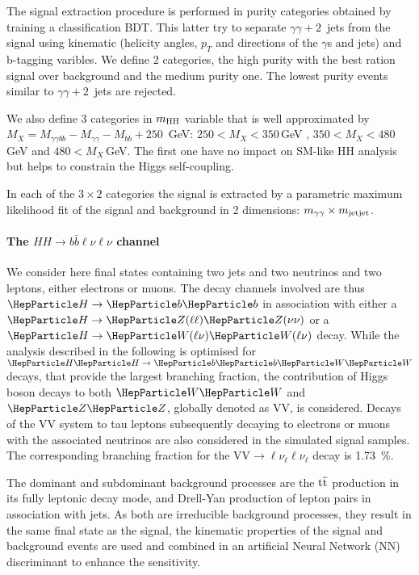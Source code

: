The signal extraction procedure is performed in purity categories obtained by training a classification BDT. This latter try to separate $\gamma\gamma + 2$~jets from the signal using kinematic (helicity angles, $p_T$ and directions of the $\gamma$s and jets) and b-tagging varibles. We define 2 categories, the high purity with the best ration signal over background and the medium purity one. The lowest purity events similar to $\gamma\gamma + 2$~jets are rejected.

We also define 3 categories in $m_{\rm HH}$ variable that is well approximated by $M_{X} = M_{\gamma\gamma bb} - M_{\gamma\gamma} - M_{bb} + 250$~GeV: $250 < M_{X} < 350$\,GeV , $350 < M_{X} < 480$\,GeV and  $480 < M_{X}$\,GeV. The first one have no impact on SM-like HH analysis but helps to constrain the Higgs self-coupling.

In each of the $3 \times 2$ categories the signal is extracted by a parametric maximum likelihood fit of the signal and background in 2 dimensions: $m_{\gamma\gamma} \times m_{\rm jet jet}$.

\paragraph{The $HH \rightarrow b\bar{b}\ell\nu\ell\nu$ channel}

We consider here \HH final states containing two \PQb jets  and two neutrinos and two leptons, either electrons or muons.
The decay channels involved are thus $\PH\to\bb$ in association with either a $\PH\to\PZ(\ell\ell)\PZ(\nu\nu)$ or a $\PH \to \PW(\ell\nu)\PW(\ell\nu)$ decay.
While the analysis described in the following is optimised for $\HH\to\bbWW$ decays, that provide the largest branching fraction, the contribution of Higgs boson decays to both $\PW\PW$ and $\PZ\PZ$, globally denoted as $\text{VV}$, is considered.
Decays of the $\text{VV}$ system to tau leptons subsequently decaying to electrons or muons with the associated neutrinos are also considered in the simulated signal samples.
The corresponding branching fraction for the $\text{VV}\to\ell\nu_\ell\ell\nu_\ell$ decay is 1.73~\%.

The dominant and subdominant background processes are
the $\text{t}\overline{\text{t}}$ production in its fully leptonic decay mode, and
Drell-Yan production of lepton pairs in association with jets.
As both are irreducible background processes, \ie they result in the same final state as the signal, the kinematic properties of the signal and background events are used and combined in an artificial Neural Network (NN) discriminant to enhance the sensitivity.

